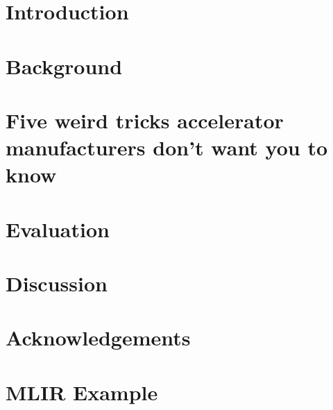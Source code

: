 \documentclass[sigconf,techreport]{acmart}
\begin{document}


\maketitle

\tableofcontents

\section{Introduction}\label{sec:introduction}


\section{Background}\label{sec:background}


\section{Five weird tricks accelerator manufacturers don't want you to know}\label{sec:methodology}


\section{Evaluation}\label{sec:evaluation}


\section{Discussion}\label{sec:discussion}


\section{Acknowledgements}




\appendix

\section{MLIR Example}\label{sec:mlir_example}

\end{document}
